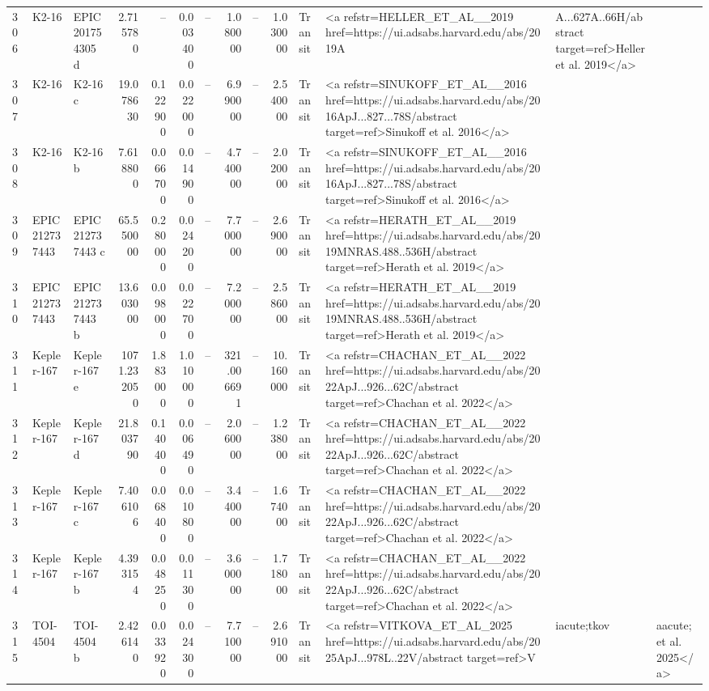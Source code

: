 \begin{tabular}{lllrrrrrrrll}
306 & K2-16 & EPIC 201754305 d & 2.715780 & -- & 0.003400 & -- & 1.080000 & -- & 1.030000 & Transit & <a refstr=HELLER_ET_AL__2019 href=https://ui.adsabs.harvard.edu/abs/2019A&A...627A..66H/abstract target=ref>Heller et al. 2019</a> \\
307 & K2-16 & K2-16 c & 19.078630 & 0.122900 & 0.022000 & -- & 6.990000 & -- & 2.540000 & Transit & <a refstr=SINUKOFF_ET_AL__2016 href=https://ui.adsabs.harvard.edu/abs/2016ApJ...827...78S/abstract target=ref>Sinukoff et al. 2016</a> \\
308 & K2-16 & K2-16 b & 7.618800 & 0.066700 & 0.014900 & -- & 4.740000 & -- & 2.020000 & Transit & <a refstr=SINUKOFF_ET_AL__2016 href=https://ui.adsabs.harvard.edu/abs/2016ApJ...827...78S/abstract target=ref>Sinukoff et al. 2016</a> \\
309 & EPIC 212737443 & EPIC 212737443 c & 65.550000 & 0.280000 & 0.024200 & -- & 7.700000 & -- & 2.690000 & Transit & <a refstr=HERATH_ET_AL__2019 href=https://ui.adsabs.harvard.edu/abs/2019MNRAS.488..536H/abstract target=ref>Herath et al. 2019</a> \\
310 & EPIC 212737443 & EPIC 212737443 b & 13.603000 & 0.098000 & 0.022700 & -- & 7.200000 & -- & 2.586000 & Transit & <a refstr=HERATH_ET_AL__2019 href=https://ui.adsabs.harvard.edu/abs/2019MNRAS.488..536H/abstract target=ref>Herath et al. 2019</a> \\
311 & Kepler-167 & Kepler-167 e & 1071.232050 & 1.883000 & 1.010000 & -- & 321.006691 & -- & 10.160000 & Transit & <a refstr=CHACHAN_ET_AL__2022 href=https://ui.adsabs.harvard.edu/abs/2022ApJ...926...62C/abstract target=ref>Chachan et al. 2022</a> \\
312 & Kepler-167 & Kepler-167 d & 21.803790 & 0.140400 & 0.006490 & -- & 2.060000 & -- & 1.238000 & Transit & <a refstr=CHACHAN_ET_AL__2022 href=https://ui.adsabs.harvard.edu/abs/2022ApJ...926...62C/abstract target=ref>Chachan et al. 2022</a> \\
313 & Kepler-167 & Kepler-167 c & 7.406106 & 0.068400 & 0.010800 & -- & 3.440000 & -- & 1.674000 & Transit & <a refstr=CHACHAN_ET_AL__2022 href=https://ui.adsabs.harvard.edu/abs/2022ApJ...926...62C/abstract target=ref>Chachan et al. 2022</a> \\
314 & Kepler-167 & Kepler-167 b & 4.393154 & 0.048250 & 0.011300 & -- & 3.600000 & -- & 1.718000 & Transit & <a refstr=CHACHAN_ET_AL__2022 href=https://ui.adsabs.harvard.edu/abs/2022ApJ...926...62C/abstract target=ref>Chachan et al. 2022</a> \\
315 & TOI-4504 & TOI-4504 b & 2.426140 & 0.033920 & 0.024300 & -- & 7.710000 & -- & 2.691000 & Transit & <a refstr=VITKOVA_ET_AL_2025 href=https://ui.adsabs.harvard.edu/abs/2025ApJ...978L..22V/abstract target=ref>V&iacute;tkov&aacute; et al. 2025</a> \\

\end{tabular}
